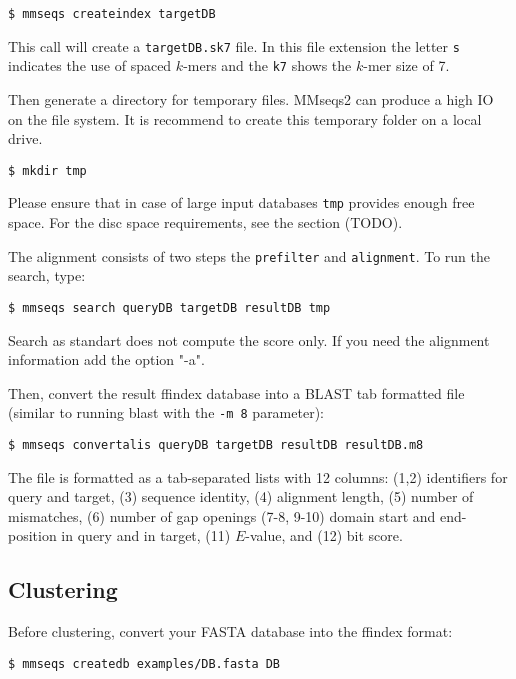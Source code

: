 \documentclass[11pt,a4paper]{scrreprt}
\begin{document}
\begin{verbatim}
$ mmseqs createindex targetDB
\end{verbatim}

This call will create a \texttt{targetDB.sk7} file. In this file extension the letter \texttt{s} indicates the use of spaced $k$-mers and the \texttt{k7} shows the $k$-mer size of 7.

Then generate a directory for temporary files. MMseqs2 can produce a high IO on the file system. It is recommend to create this temporary folder on a local drive.

\begin{verbatim}
$ mkdir tmp
\end{verbatim}

Please ensure that in case of large input databases \texttt{tmp} provides enough free space. For the disc space requirements, see the section (TODO).

The alignment consists of two steps the \texttt{prefilter} and \texttt{alignment}. To run the search, type:

\begin{verbatim}
$ mmseqs search queryDB targetDB resultDB tmp
\end{verbatim}
Search as standart does not compute the score only. If you need the alignment information add the option "-a". 

Then, convert the result ffindex database into a BLAST tab formatted file (similar to running blast with the \texttt{-m 8} parameter):

\begin{verbatim}
$ mmseqs convertalis queryDB targetDB resultDB resultDB.m8
\end{verbatim}

The file is formatted as a tab-separated lists with 12 columns: (1,2) identifiers for query and target, (3) sequence identity, (4) alignment length, (5) number of mismatches, (6) number of gap openings (7-8, 9-10) domain start and end-position in query and in target, (11) $E$-value, and (12) bit score.
\subsection*{Clustering}
Before clustering, convert your FASTA database into the ffindex format:

\begin{verbatim}
$ mmseqs createdb examples/DB.fasta DB
\end{verbatim}
\end{document}
